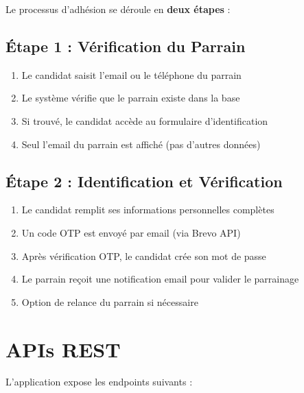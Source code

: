 \documentclass[12pt,a4paper]{article}
\begin{document}
Le processus d'adhésion se déroule en \textbf{deux étapes} :

\subsection{Étape 1 : Vérification du Parrain}
\begin{enumerate}
    \item Le candidat saisit l'email ou le téléphone du parrain
    \item Le système vérifie que le parrain existe dans la base
    \item Si trouvé, le candidat accède au formulaire d'identification
    \item Seul l'email du parrain est affiché (pas d'autres données)
\end{enumerate}

\subsection{Étape 2 : Identification et Vérification}
\begin{enumerate}
    \item Le candidat remplit ses informations personnelles complètes
    \item Un code OTP est envoyé par email (via Brevo API)
    \item Après vérification OTP, le candidat crée son mot de passe
    \item Le parrain reçoit une notification email pour valider le parrainage
    \item Option de relance du parrain si nécessaire
\end{enumerate}

\section{APIs REST}

L'application expose les endpoints suivants :
\end{document}

